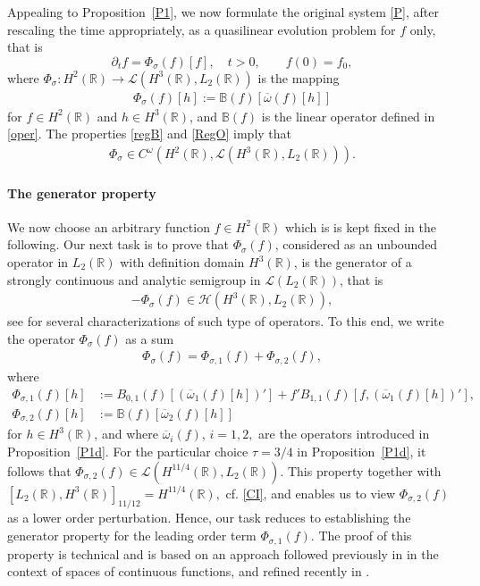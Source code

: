 \documentclass[11pt,reqno]{amsart}
\numberwithin{equation}{section}
\newcommand{\0}{\Omega}
\newcommand{\p}{\partial}
\newcommand{\ov}{\overline}
\newcommand{\oo}{\ov\omega}
\newcommand{\bB}{\mathbb{B}}
\newcommand{\kH}{\mathcal{H}}
\newcommand{\kL}{\mathcal{L}}
\newcommand{\R}{\mathbb{R}}
\numberwithin{equation}{section}
\begin{document}
Appealing to Proposition~\ref{P1}, we  now   formulate the original  system \eqref{P}, after rescaling  the time appropriately, as a quasilinear evolution problem for $f$ only, that is
\begin{equation}\label{Pest1}
  \p_t f= \Phi_{\sigma}(f)[f],\quad t>0,\qquad f(0)=f_0,
\end{equation}
where $\Phi_{\sigma}:H^2(\R)\to \kL(H^3(\R), L_2(\R))$ is the mapping
\begin{align*}
 \Phi_{\sigma}(f)[h] :=\bB(f)[\ov\omega(f)[h]]
\end{align*}
for $f\in H^2(\R)$ and $h\in H^3(\R)$, and $\bB(f)$ is the linear operator  defined in \eqref{oper}.
The properties \eqref{regB} and \eqref{RegO} imply that
\begin{align}\label{reg2}
  \Phi_{\sigma}\in C^{\omega}  (H^2(\R),\kL(H^3(\R), L_2(\R))).
\end{align}
 
\medskip



\paragraph{\bf The generator property}
We now choose an arbitrary  function $f\in H^2(\R) $ which is is kept fixed in the following. 
Our next task is to prove that  $\Phi_{\sigma}(f)$, considered as an unbounded operator  in $L_2(\R)$ with definition domain $H^3(\R)$, is  the generator of a strongly continuous
and analytic semigroup in $\kL(L_2(\R))$, that is
\begin{align}\label{GP}
  -\Phi_{\sigma}(f)\in \kH  (H^3(\R), L_2(\R)),
\end{align}
see \cite{Am95, L95} for several characterizations of such type of operators.
To this end, we write  the operator $\Phi_{\sigma}(f)$ as a sum
\begin{align*} 
  \Phi_{\sigma}(f) =\Phi_{\sigma,1}(f)+\Phi_{\sigma,2}(f),  
\end{align*}
where
\begin{align*}
 \Phi_{\sigma,1}(f)[h] &:=B_{0,1}(f)[(\oo_1(f)[h])'] +f'B_{1,1}(f)[f,(\oo_1(f)[h])'], \\[1ex]
   \Phi_{\sigma,2}(f)[h] &:=\bB(f)[\oo_2(f)[h]]  
\end{align*}
for   $h\in H^3(\R)$, and where $\oo_i(f)$, $i=1,2,$ are the operators introduced in Proposition~\ref{P1d}.
For the particular choice $\tau=3/4$ in Proposition~\ref{P1d}, it follows that  $\Phi_{\sigma,2}(f)\in\kL(H^{11/4}(\R), L_2(\R)).$ This property together with $[L_2(\R), H^3(\R)]_{11/12}=H^{11/4}(\R),$ cf. \eqref{CI}, 
and \cite[Proposition~2.4.1]{L95} enables us to view $\Phi_{\sigma,2}(f)$ as a lower order perturbation.
Hence, our task reduces to establishing the generator property for the leading order term  $\Phi_{\sigma,1}(f).$
The proof of this property is  technical and  is based on an approach followed previously in \cite{E94,   ES95,  ES97} in the context of spaces of continuous functions, and refined recently in \cite{EMW15, M16x}.
\end{document}
